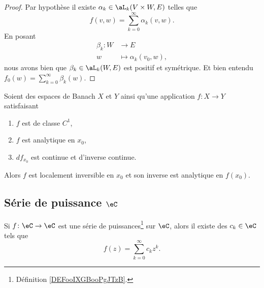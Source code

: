 \begin{proof}
	Par hypothèse il existe \( \alpha_k\in\aL_k(V\times W,E) \) telles que
	\begin{equation}
		f(v,w)=\sum_{k=0}^{\infty}\alpha_k(v,w).
	\end{equation}
	En posant
	\begin{equation}
		\begin{aligned}
			\beta_k\colon W & \to E                    \\
			w               & \mapsto \alpha_k(v_0,w),
		\end{aligned}
	\end{equation}
	nous avons bien que \( \beta_k\in\aL_k(W,E)\) est positif et symétrique. Et bien entendu \( f_0(w)=\sum_{k=0}^{\infty}\beta_k(w)\).
\end{proof}

\begin{theorem}	\label{THOooSZHVooKSEmuI}
	Soient des espaces de Banach \( X\) et \( Y\) ainsi qu'une application \(f \colon X\to Y  \) satisfaisant
	\begin{enumerate}
		\item
		      \( f\) est de classe \( C^1\),
		\item
		      \( f\) est analytique en \( x_0\),
		\item
		      \( df_{x_0}\) est continue  et d'inverse continue.
	\end{enumerate}
	Alors \( f\) est localement inversible en \( x_0\) et son inverse est analytique en \( f(x_0)\).
\end{theorem}



\subsection{Série de puissance \( \eC\)}

\begin{proposition}	\label{PROPooBFGJooYVvYaw}
	Si \(f \colon \eC\to \eC  \) est une série de puissances\footnote{Définition \ref{DEFooIXGBooPgJTzB}.} sur \( \eC\), alors il existe des \( c_k\in \eC\) tels que
	\begin{equation}
		f(z)=\sum_{k=0}^{\infty}c_kz^k.
	\end{equation}
\end{proposition}

